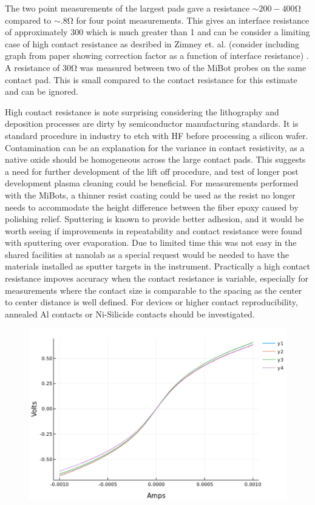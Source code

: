 The two point measurements of the largest pads gave a resistance $\sim 200-400 \si{\ohm}$ compared to  $\sim .8 \si{\ohm}$ for four point measurements. This gives an interface resistance of approximately $300$ which is much greater than 1 and can be consider a limiting case of high contact resistance as desribed in Zimney et. al. (consider including graph from paper showing correction factor as a function of interface resistance) \cite{Zimney2007CorrectionStudy}. A resistance of $30 \si{\ohm}$ was measured between two of the MiBot probes on the same contact pad. This is small compared to the contact resistance for this estimate and can be ignored.  


High contact resistance is note surprising considering the lithography and deposition processes are dirty by semiconductor manufacturing standards. It is standard procedure in industry to etch with HF before processing a silicon wafer. Contamination can be an explanation for the variance in contact resistivity, as a native oxide should be homogeneous across the large contact pads. This suggests a need for further development of the lift off procedure, and test of longer post development plasma cleaning could be beneficial. For measurements performed with the MiBots, a thinner resist coating could be used as the resist no longer needs to accommodate the height difference between the fiber epoxy caused by polishing relief. Sputtering is known to provide better adhesion, and it would be worth seeing if improvements in repeatability and contact resistance were found with sputtering over evaporation. Due to limited time this was not easy in the shared facilities at nanolab as a special request would be needed to have the materials installed as sputter targets in the instrument. Practically a high contact resistance impoves accuracy when the contact resistance is variable, especially for measurements where the contact size is comparable to the spacing as the center to center distance is well defined. For devices or higher contact reproducibility, annealed Al contacts or Ni-Silicide contacts should be investigated. 

\begin{figure}
    \centering
    \includegraphics[width=\textwidth]{fig/Results/2pnt_compareMb25.jpg}
    \caption{}
    \label{fig:mb25 2pnt}
\end{figure}
\FloatBarrier

